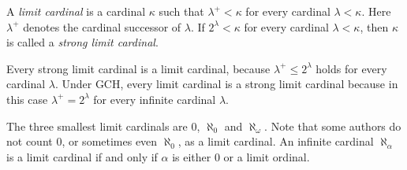 \documentclass[12pt]{article}
\begin{document}

A {\em limit cardinal} is a cardinal $\kappa$ such that $\lambda^+<\kappa$ for every cardinal $\lambda<\kappa$. Here $\lambda^+$ denotes the cardinal successor of $\lambda$. If $2^\lambda<\kappa$ for every cardinal $\lambda<\kappa$, then $\kappa$ is called a {\em strong limit cardinal}. 

Every strong limit cardinal is a limit cardinal, because $\lambda^+\leq2^\lambda$ holds for every cardinal $\lambda$.
Under GCH, every limit cardinal is a strong limit cardinal because in this case $\lambda^+=2^\lambda$ for every infinite cardinal $\lambda$.

The three smallest limit cardinals are $0$, $\aleph_0$ and $\aleph_\omega$.
Note that some authors do not count $0$, or sometimes even $\aleph_0$, as a limit cardinal.
An infinite cardinal $\aleph_\alpha$ is a limit cardinal
if and only if $\alpha$ is either $0$ or a limit ordinal.
\end{document}
